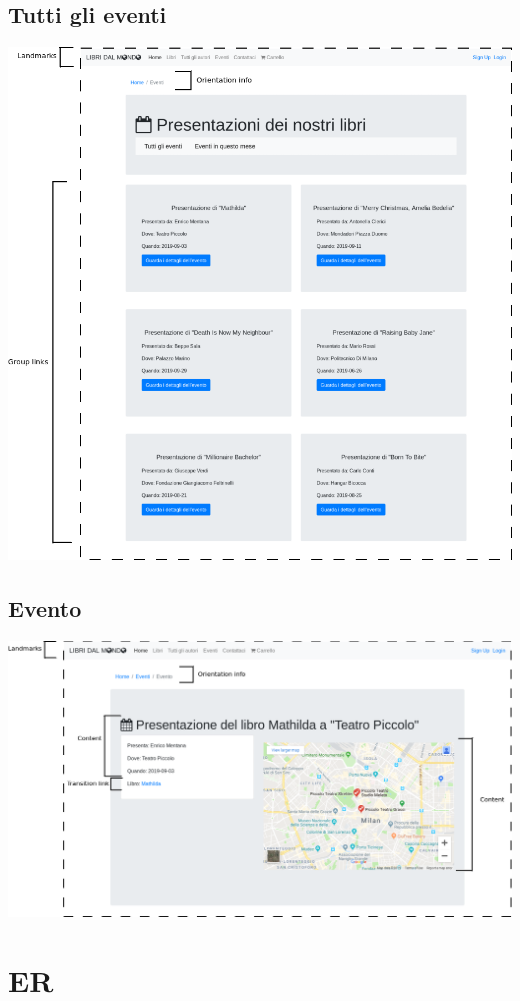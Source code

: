 \documentclass[12pt,a4paper,oneside]{report}
\begin{document}
\section{Tutti gli eventi}

\includegraphics[width=1\textwidth]{tutti_eventi}

\section{Evento}

\includegraphics[width=1\textwidth]{evento}

\chapter{ER}
\end{document}
